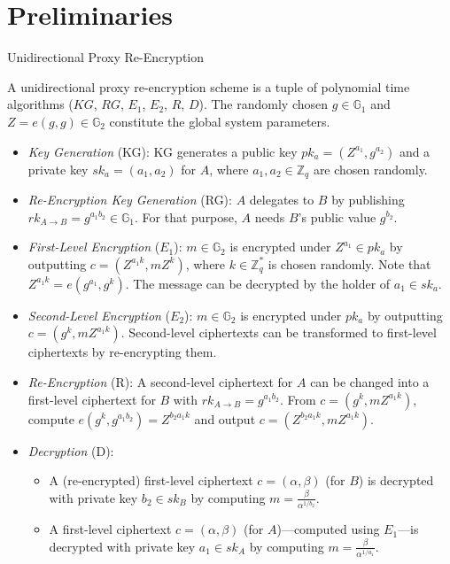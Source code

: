 \documentclass{llncs}
\begin{document}
\section{Preliminaries} \label{preliminaries}


\begin{definition}{Unidirectional Proxy Re-Encryption} \cite{ateniese_improved}
\label{re-enc}

A unidirectional proxy re-encryption scheme is a tuple of polynomial time algorithms ($KG$, $RG$, $E_{1}$, $E_{2}$, $R$, $D$). The randomly chosen $g \in \mathbb G_{1}$ and $Z = e(g,g) \in \mathbb G_{2}$ constitute the global system parameters.

\begin{itemize}

\item \emph{Key Generation} (KG): KG generates a public key $pk_{a} = (Z^{a_{1}}, g^{a_{2}})$ and a private key $sk_{a} = (a_{1}, a_{2})$ for $A$, where $a_{1}, a_{2} \in \mathbb Z_{q}$ are chosen randomly. 

\item \emph{Re-Encryption Key Generation} (RG): $A$ delegates to $B$ by publishing $rk_{A \rightarrow B} = g^{a_{1} b_{2}} \in \mathbb G_{1}$. For that purpose, $A$ needs $B$'s public value $g^{b_{2}}$. 

\item \emph{First-Level Encryption} ($E_{1}$): $m \in \mathbb G_{2}$ is encrypted under $Z^{a_{1}} \in pk_{a}$ by outputting $c = (Z^{a_{1}k}, mZ^{k})$, where $k \in \mathbb Z_{q}^{*}$ is chosen randomly. Note that $Z^{a_{1}k} = e(g^{a_{1}}, g^{k})$. The message can be decrypted by the holder of $a_{1} \in sk_{a}$. 

\item \emph{Second-Level Encryption} ($E_{2}$): $m \in \mathbb G_{2}$ is encrypted under $pk_{a}$ by outputting $c = (g^{k}, mZ^{a_{1}k})$. Second-level ciphertexts can be transformed to first-level ciphertexts by re-encrypting them. 

\item \emph{Re-Encryption} (R): A second-level ciphertext for $A$ can be changed into a first-level ciphertext for $B$ with $rk_{A \rightarrow B} = g^{a_{1}b_{2}}$. From $c = (g^{k}, mZ^{a_{1}k})$, compute $e(g^{k},g^{a_{1}b_{2}}) = Z^{b_{2}a_{1}k}$ and output $c = (Z^{b_{2}a_{1}k}, mZ^{a_{1}k})$. 

\item \emph{Decryption} (D): 

\begin{itemize}
\item A (re-encrypted) first-level ciphertext $c = (\alpha, \beta)$ (for $B$) is decrypted with private key $b_{2} \in sk_{B}$ by computing $m = \frac{\beta}{\alpha^{1/b_{2}}}$. 
\item A first-level ciphertext $c = (\alpha, \beta)$ (for $A$)---computed using $E_{1}$---is decrypted with private key $a_{1} \in sk_{A}$ by computing $m = \frac{\beta}{\alpha^{1/a_{1}}}$.
\end{itemize}

\end{itemize}

\end{definition}
\end{document}
